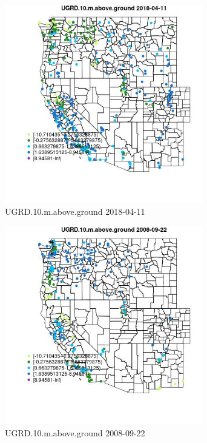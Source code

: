 \begin{figure} 
\centering  
\includegraphics[width=0.77\textwidth]{Code_Outputs/Report_ML_input_PM25_Step4_part_e_de_duplicated_aves_compiled_2019-05-18wNAs_MapObsUGRD10maboveground2018-04-11.jpg} 
\caption{\label{fig:Report_ML_input_PM25_Step4_part_e_de_duplicated_aves_compiled_2019-05-18wNAsMapObsUGRD10maboveground2018-04-11}UGRD.10.m.above.ground 2018-04-11} 
\end{figure} 
 

\begin{figure} 
\centering  
\includegraphics[width=0.77\textwidth]{Code_Outputs/Report_ML_input_PM25_Step4_part_e_de_duplicated_aves_compiled_2019-05-18wNAs_MapObsUGRD10maboveground2008-09-22.jpg} 
\caption{\label{fig:Report_ML_input_PM25_Step4_part_e_de_duplicated_aves_compiled_2019-05-18wNAsMapObsUGRD10maboveground2008-09-22}UGRD.10.m.above.ground 2008-09-22} 
\end{figure} 
 

